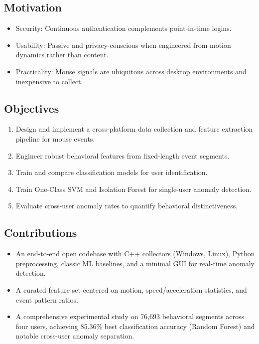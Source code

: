\documentclass[
  12pt,
]{article}
\providecommand{\tightlist}{%
  \setlength{\itemsep}{0pt}\setlength{\parskip}{0pt}}
\begin{document}
\subsection{Motivation}\label{motivation}

\begin{itemize}
\tightlist
\item
  Security: Continuous authentication complements point-in-time logins.
\item
  Usability: Passive and privacy-conscious when engineered from motion
  dynamics rather than content.
\item
  Practicality: Mouse signals are ubiquitous across desktop environments
  and inexpensive to collect.
\end{itemize}

\subsection{Objectives}\label{objectives}

\begin{enumerate}
\def\labelenumi{\arabic{enumi}.}
\tightlist
\item
  Design and implement a cross-platform data collection and feature
  extraction pipeline for mouse events.
\item
  Engineer robust behavioral features from fixed-length event segments.
\item
  Train and compare classification models for user identification.
\item
  Train One-Class SVM and Isolation Forest for single-user anomaly
  detection.
\item
  Evaluate cross-user anomaly rates to quantify behavioral
  distinctiveness.
\end{enumerate}

\subsection{Contributions}\label{contributions}

\begin{itemize}
\tightlist
\item
  An end-to-end open codebase with C++ collectors (Windows, Linux),
  Python preprocessing, classic ML baselines, and a minimal GUI for
  real-time anomaly detection.
\item
  A curated feature set centered on motion, speed/acceleration
  statistics, and event pattern ratios.
\item
  A comprehensive experimental study on 76,693 behavioral segments
  across four users, achieving 85.36\% best classification accuracy
  (Random Forest) and notable cross-user anomaly separation.
\end{itemize}
\end{document}
